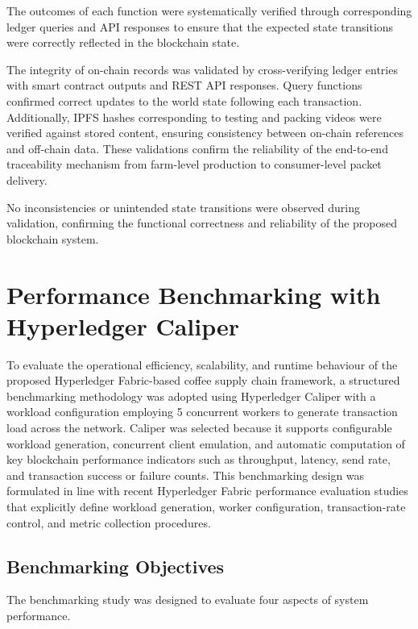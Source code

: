 \documentclass[12pt]{article}
\begin{document}
	The outcomes of each function were systematically verified through corresponding ledger queries and API responses to ensure that the expected state transitions were correctly reflected in the blockchain state.
	
	The integrity of on-chain records was validated by cross-verifying ledger entries with smart contract outputs and REST API responses. Query functions confirmed correct updates to the world state following each transaction. Additionally, IPFS hashes corresponding to testing and packing videos were verified against stored content, ensuring consistency between on-chain references and off-chain data. These validations confirm the reliability of the end-to-end traceability mechanism from farm-level production to consumer-level packet delivery.
	
	No inconsistencies or unintended state transitions were observed during validation, confirming the functional correctness and reliability of the proposed blockchain system.
	
	
	
	
	
	\section{Performance Benchmarking with Hyperledger Caliper}
	
	To evaluate the operational efficiency, scalability, and runtime behaviour of the proposed Hyperledger Fabric-based coffee supply chain framework, a structured benchmarking methodology was adopted using Hyperledger Caliper with a workload configuration employing 5 concurrent workers to generate transaction load across the network. Caliper was selected because it supports configurable workload generation, concurrent client emulation, and automatic computation of key blockchain performance indicators such as throughput, latency, send rate, and transaction success or failure counts. This benchmarking design was formulated in line with recent Hyperledger Fabric performance evaluation studies that explicitly define workload generation, worker configuration, transaction-rate control, and metric collection procedures.
	
	\subsection{Benchmarking Objectives}
	
	The benchmarking study was designed to evaluate four aspects of system performance.
	
\end{document}
